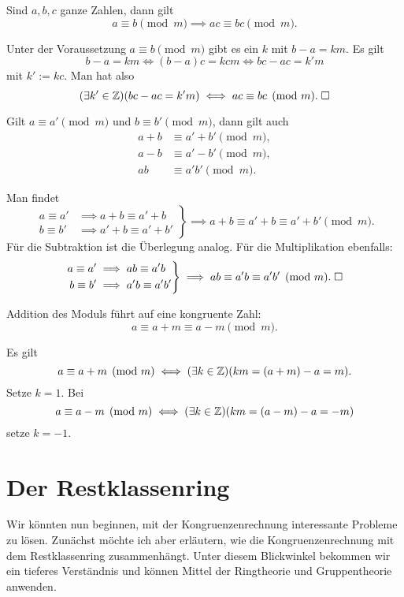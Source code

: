 \newpage
\begin{Satz}\label{Kongruenz-mul}
Sind $a,b,c$ ganze Zahlen, dann gilt
\[a\equiv b\pmod{m} \implies ac\equiv bc\pmod{m}.\]
\end{Satz}
Unter der Voraussetzung $a\equiv b\pmod{m}$ gibt es ein
$k$ mit $b-a=km$. Es gilt
\[b-a=km\iff (b-a)c=kcm \iff bc-ac=k'm\]
mit $k':=kc$. Man hat also
\[(\exists k'\in\mathbb Z)(bc-ac=k'm)\iff ac\equiv bc\pmod{m}.\;\Box\]

\begin{Satz}
Gilt $a\equiv a'\pmod{m}$ und
$b\equiv b'\pmod{m}$, dann gilt auch
\begin{align*}
a+b&\equiv a'+b'\pmod{m},\\
a-b&\equiv a'-b'\pmod{m},\\
ab&\equiv a'b'\pmod{m}.
\end{align*}
\end{Satz}
 Man findet
\begin{equation}
\left.\begin{aligned}
a\equiv a'&\implies a+b\equiv a'+b\\
b\equiv b'&\implies a'+b\equiv a'+b'
\end{aligned}\right\}
\implies a+b\equiv a'+b\equiv a'+b'\pmod{m}.
\end{equation}
Für die Subtraktion ist die Überlegung analog. Für die Multiplikation
ebenfalls:%
\begin{equation}
\left.\begin{aligned}
a\equiv a'&\implies ab\equiv a'b\\
b\equiv b'&\implies a'b\equiv a'b'
\end{aligned}\right\}
\implies ab\equiv a'b\equiv a'b'\pmod{m}.\;\Box
\end{equation}

\begin{Satz}
Addition des Moduls führt auf eine kongruente Zahl:%
\[a\equiv a+m\equiv a-m\pmod{m}.\]
\end{Satz}
Es gilt
\[a\equiv a+m\pmod{m}\iff (\exists k\in\mathbb Z)(km=(a+m)-a=m).\]
Setze $k=1$. Bei
\[a\equiv a-m\pmod{m}\iff (\exists k\in\mathbb Z)(km=(a-m)-a=-m)\]
setze $k=-1$.\;\qedsymbol

\section{Der Restklassenring}

Wir könnten nun beginnen, mit der Kongruenzenrechnung interessante
Probleme zu lösen. Zunächst möchte ich aber erläutern, wie die
Kongruenzenrechnung mit dem Restklassenring zusammenhängt. Unter
diesem Blickwinkel bekommen wir ein tieferes Verständnis und können
Mittel der Ringtheorie und Gruppentheorie anwenden.

